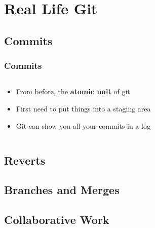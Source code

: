 \documentclass{beamer}
\begin{document}
\begin{frame}
\end{frame}

\section{Real Life Git}

\subsection{Commits}
\begin{frame}
    \frametitle{Commits}

    \begin{columns}
        \begin{column}{0.5\textwidth}
            \begin{itemize}[<+->]
                \item From before, the \textbf{atomic unit} of git
                \item First need to put things into a staging area
                \item Git can show you all your commits in a log
            \end{itemize}
        \end{column}
        \begin{column}{0.5\textwidth}
        \end{column}
    \end{columns}
\end{frame}

\subsection{Reverts}
\subsection{Branches and Merges}
\subsection{Collaborative Work}
\end{document}
